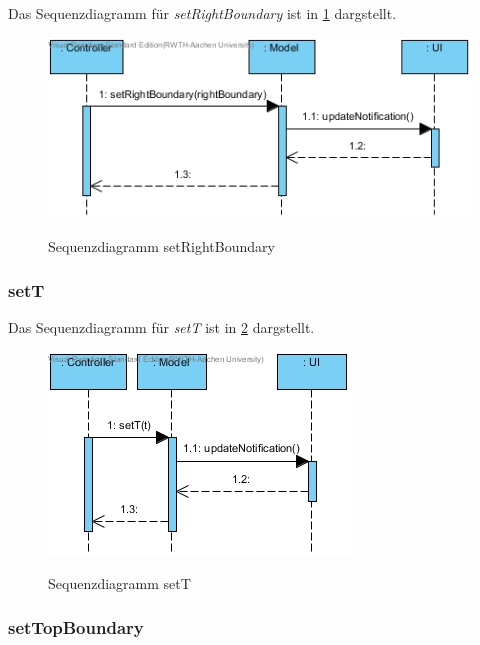 Das Sequenzdiagramm für \emph{setRightBoundary} ist in \ref{Sequenzdiagramm setRightBoundary} dargstellt.

\begin{figure}[H]
	\centering
	\includegraphics[scale=.6]{Bilder/Model__setRightBoundary().jpg}\\
	\caption{Sequenzdiagramm setRightBoundary}
	\label{Sequenzdiagramm setRightBoundary}
\end{figure}

\subsubsection*{setT}

Das Sequenzdiagramm für \emph{setT} ist in \ref{Sequenzdiagramm setT} dargstellt.

\begin{figure}[H]
	\centering
	\includegraphics[scale=.6]{Bilder/Model__setT().jpg}\\
	\caption{Sequenzdiagramm setT}
	\label{Sequenzdiagramm setT}
\end{figure}

\subsubsection*{setTopBoundary}

